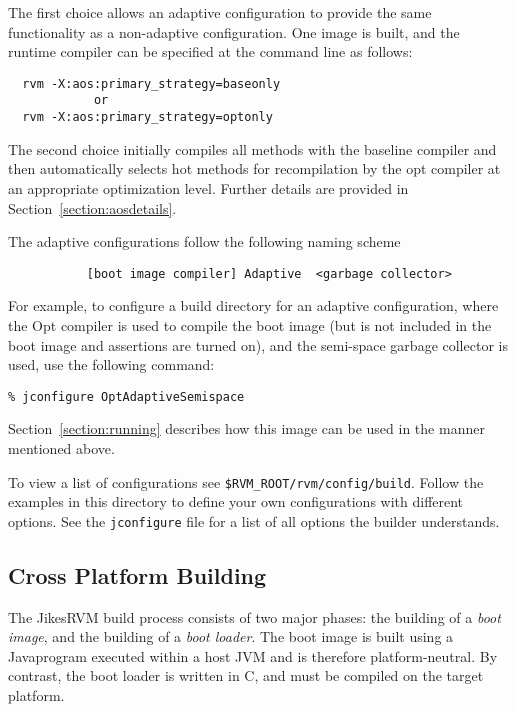 The first choice allows an adaptive configuration to provide the same
functionality as a non-adaptive configuration.  One image is built,
and the runtime compiler can be specified at the command line as
follows:
\begin{verbatim}
  rvm -X:aos:primary_strategy=baseonly
            or
  rvm -X:aos:primary_strategy=optonly
\end{verbatim}

The second choice initially compiles all methods with the
baseline compiler and then automatically selects hot methods for
recompilation by the opt compiler at an appropriate optimization
level. Further details are provided in Section~\ref{section:aosdetails}.

The adaptive configurations follow the following naming scheme
\begin{verbatim}
           [boot image compiler] Adaptive  <garbage collector>
\end{verbatim}

For example, to configure a build 
directory for an adaptive configuration, where the Opt compiler is 
used to compile the boot image (but is not included in the boot image
and assertions are turned on), and the semi-space garbage collector is
used, use the following command:

\begin{verbatim}
% jconfigure OptAdaptiveSemispace
\end{verbatim}

Section~\ref{section:running} describes how this image can be used in
the manner mentioned above.

To view a list of configurations see 
{\tt \$RVM\_ROOT/rvm/config/build}.  Follow the examples in this
directory to define your own configurations with different options.  See
the {\tt jconfigure} file for a list of all options the builder
understands.

\JikesTMFooter

\subsection{Cross Platform Building}

The Jikes\trademark RVM build process consists of two major phases:
the building of a 
{\em boot image}, and the building of a {\em boot loader}.
The boot image is built using a Java\trademark program executed within a host
JVM and is therefore platform-neutral.  By contrast, the boot loader
is written in C, and must be compiled on the target platform.


